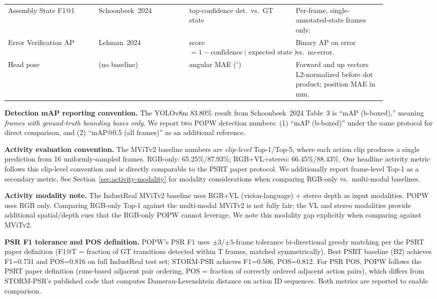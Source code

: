 \documentclass[11pt,a4paper]{article}
\newcommand{\tabulatecite}[1]{\cite{#1}}
\begin{document}
\begin{table}[!htbp]
\begin{tabular}{p{0.22\linewidth} p{0.22\linewidth} p{0.22\linewidth} p{0.22\linewidth}}
Assembly State F1@1 & Schoonbeek~2024~\tabulatecite{schoonbeek2024industreal} & top-confidence det.\ vs.\ GT state & Per-frame, single-annotated-state frames only. \\
Error Verification AP & Lehman~2024~\tabulatecite{lehman2024statediffnet} & score $= 1 - \text{confidence}(\text{expected state})$ & Binary AP on error vs.\ no-error. \\
Head pose & (no baseline) & angular MAE ($^\circ$) & Forward and up vectors L2-normalized before dot product; position MAE in mm. \\
\bottomrule
\end{tabular}
\end{table}

\vspace{0.5em}
\noindent\textbf{Detection mAP reporting convention.} The YOLOv8m 83.80\% result from Schoonbeek~2024 Table~3 is ``mAP (b-boxed),'' meaning \textit{frames with ground-truth bounding boxes only}. We report two POPW detection numbers: (1) ``mAP (b-boxed)'' under the same protocol for direct comparison, and (2) ``mAP@0.5 (all frames)'' as an additional reference.

\vspace{0.5em}
\noindent\textbf{Activity evaluation convention.} The MViTv2 baseline numbers are \textit{clip-level} Top-1/Top-5, where each action clip produces a single prediction from 16 uniformly-sampled frames. RGB-only: 65.25\%/87.93\%; RGB+VL+stereo: 66.45\%/88.43\%. Our headline activity metric follows this clip-level convention and is directly comparable to the PSRT paper protocol. We additionally report frame-level Top-1 as a secondary metric. See Section~\ref{sec:activity-modality} for modality considerations when comparing RGB-only vs.\ multi-modal baselines.

\label{sec:activity-modality}
\vspace{0.5em}
\noindent\textbf{Activity modality note.} The IndustReal MViTv2 baseline uses RGB+VL (vision-language) + stereo depth as input modalities. POPW uses RGB only. Comparing RGB-only Top-1 against the multi-modal MViTv2 is not fully fair; the VL and stereo modalities provide additional spatial/depth cues that the RGB-only POPW cannot leverage. We note this modality gap explicitly when comparing against MViTv2.

\vspace{0.5em}
\noindent\textbf{PSR F1 tolerance and POS definition.} POPW's PSR F1 uses $\pm3$/$\pm5$-frame tolerance bi-directional greedy matching per the PSRT paper definition (F1@T = fraction of GT transitions detected within T frames, matched symmetrically). Best PSRT baseline (B2) achieves F1=0.731 and POS=0.816 on full IndustReal test set; STORM-PSR achieves F1=0.506, POS=0.812. For PSR POS, POPW follows the PSRT paper definition (runs-based adjacent pair ordering, POS = fraction of correctly ordered adjacent action pairs), which differs from STORM-PSR's published code that computes Damerau-Levenshtein distance on action ID sequences. Both metrics are reported to enable comparison.
\end{document}
